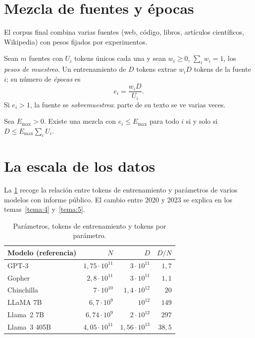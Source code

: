 \section{Mezcla de fuentes y épocas}

El corpus final combina varias fuentes (web, código, libros, artículos científicos, Wikipedia) con pesos fijados por experimentos.

\begin{definicion}\label{def:mezcla}
Sean $m$ fuentes con $U_i$ tokens únicos cada una y sean $w_i\ge 0$, $\sum_i w_i=1$, los \emph{pesos de muestreo}. Un entrenamiento de $D$ tokens extrae $w_iD$ tokens de la fuente $i$; su número de \emph{épocas} es
\[
e_i=\frac{w_iD}{U_i}.
\]
Si $e_i>1$, la fuente se \emph{sobremuestrea}: parte de su texto se ve varias veces.
\end{definicion}

\begin{proposicion}\label{prop:factible}
Sea $E_{\max}>0$. Existe una mezcla con $e_i\le E_{\max}$ para todo $i$ si y solo si $D\le E_{\max}\sum_{i}U_i$.
\end{proposicion}

\addtocounter{definicion}{1}%

\section{La escala de los datos}

La \cref{tab:tokens-param} recoge la relación entre tokens de entrenamiento y parámetros de varios modelos con informe público. El cambio entre 2020 y 2023 se explica en los temas~\ref{tema:4} y~\ref{tema:5}.

\begin{table}[h]
\centering\small
\caption{Parámetros, tokens de entrenamiento y tokens por parámetro.}\label{tab:tokens-param}
\begin{tabular}{@{}lrrr@{}}
\toprule
Modelo (referencia) & $N$ & $D$ & $D/N$ \\
\midrule
GPT-3~\cite{brown} & $1{,}75\cdot 10^{11}$ & $3\cdot 10^{11}$ & $1{,}7$ \\
Gopher~\cite{rae} & $2{,}8\cdot 10^{11}$ & $3\cdot 10^{11}$ & $1{,}1$ \\
Chinchilla~\cite{hoffmann} & $7\cdot 10^{10}$ & $1{,}4\cdot 10^{12}$ & $20$ \\
LLaMA 7B~\cite{llama} & $6{,}7\cdot 10^{9}$ & $10^{12}$ & $149$ \\
Llama~2 7B~\cite{llama2} & $6{,}74\cdot 10^{9}$ & $2\cdot 10^{12}$ & $297$ \\
Llama~3 405B~\cite{llama3} & $4{,}05\cdot 10^{11}$ & $1{,}56\cdot 10^{13}$ & $38{,}5$ \\
\bottomrule
\end{tabular}
\end{table}

